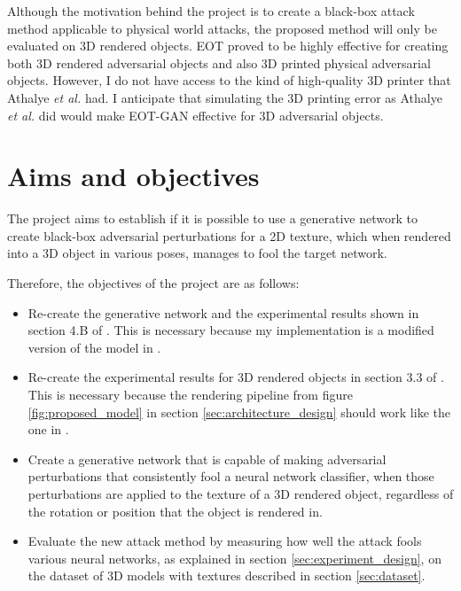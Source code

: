 Although the motivation behind the project is to create a black-box attack method applicable to physical world attacks, the proposed method will only be evaluated on 3D rendered objects. EOT \cite{athalye} proved to be highly effective for creating both 3D rendered adversarial objects and also 3D printed physical adversarial objects. However, I do not have access to the kind of high-quality 3D printer that Athalye \textit{et al.} \cite{athalye} had. I anticipate that simulating the 3D printing error as Athalye \textit{et al.} \cite{athalye} did would make EOT-GAN effective for 3D adversarial objects.

\section{Aims and objectives}
    \label{sec:aims_objectives}

The project aims to establish if it is possible to use a generative network to create black-box adversarial perturbations for a 2D texture, which when rendered into a 3D object in various poses, manages to fool the target network. 

Therefore, the objectives of the project are as follows:

\begin{itemize}
    \item Re-create the generative network and the experimental results shown in section 4.B of \cite{zheng_black_box_GAN}. This is necessary because my implementation is a modified version of the model in \cite{zheng_black_box_GAN}.
    \item Re-create the experimental results for 3D rendered objects in section 3.3 of \cite{athalye}. This is necessary because the rendering pipeline from figure \ref{fig:proposed_model} in section \ref{sec:architecture_design} should work like the one in \cite{athalye}.
    \item Create a generative network that is capable of making adversarial perturbations that consistently fool a neural network classifier, when those perturbations are applied to the texture of a 3D rendered object, regardless of the rotation or position that the object is rendered in.
    \item Evaluate the new attack method by measuring how well the attack fools various neural networks, as explained in section \ref{sec:experiment_design}, on the dataset of 3D models with textures described in section \ref{sec:dataset}.
\end{itemize}

